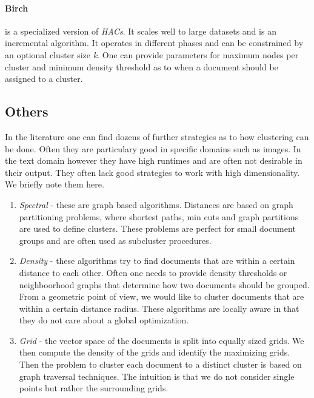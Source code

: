     \paragraph{Birch} is a specialized version of \emph{HACs}. It scales well to large datasets and is an incremental algorithm. It operates in different phases and can be constrained by an optional cluster size \emph{k}. One can provide parameters for maximum nodes per cluster and minimum density threshold as to when a document should be assigned to a cluster.
    \cite{Nothing}

    \subsection{Others}
    In the literature one can find dozens of further strategies as to how clustering can be done. Often they are particulary good in specific domains such as images. In the text domain however they have high runtimes and are often not desirable in their output. They often lack good strategies to work with high dimensionality. We briefly note them here.

      \begin{enumerate}
        \item \emph{Spectral} - these are graph based algorithms. Distances are based on graph partitioning problems, where shortest paths, min cuts and graph partitions are used to define clusters. These problems are perfect for small document groups and are often used as subcluster procedures. \cite{Nothing}
        \item \emph{Density} - these algorithms try to find documents that are within a certain distance to each other. Often one needs to provide density thresholds or neighboorhood graphs that determine how two documents should be grouped. From a geometric point of view, we would like to cluster documents that are within a certain distance radius. These algorithms are locally aware in that they do not care about a global optimization. \cite{Nothing}
        \item \emph{Grid} - the vector space of the documents is split into equally sized grids. We then compute the density of the grids and identify the maximizing grids. Then the problem to cluster each document to a distinct cluster is based on graph traversal techniques. The intuition is that we do not consider single points but rather the surrounding grids. \cite{Nothing}
      \end{enumerate}

